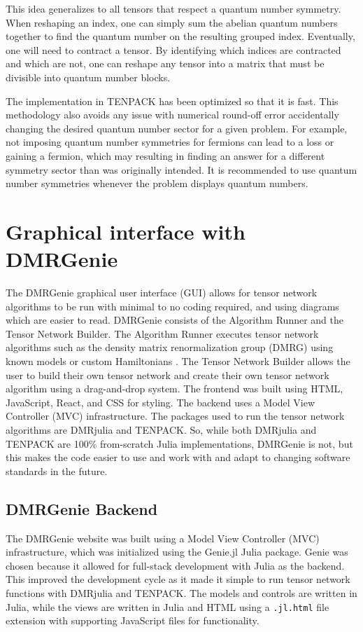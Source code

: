 \documentclass{juliacon}
\begin{document}
This idea generalizes to all tensors that respect a quantum number symmetry. When reshaping an index, one can simply sum the abelian quantum numbers together to find the quantum number on the resulting grouped index. Eventually, one will need to contract a tensor. By identifying which indices are contracted and which are not, one can reshape any tensor into a matrix that must be divisible into quantum number blocks.

The implementation in TENPACK has been optimized so that it is fast. This methodology also avoids any issue with numerical round-off error accidentally changing the desired quantum number sector for a given problem. For example, not imposing quantum number symmetries for fermions can lead to a loss or gaining a fermion, which may resulting in finding an answer for a different symmetry sector than was originally intended. It is recommended to use quantum number symmetries whenever the problem displays quantum numbers.



\section{Graphical interface with DMRGenie}
The DMRGenie graphical user interface (GUI) allows for tensor network algorithms to be run with minimal to no coding required, and using diagrams which are easier to read. DMRGenie consists of the Algorithm Runner and the Tensor Network Builder. The Algorithm Runner executes tensor network algorithms such as the density matrix renormalization group (DMRG) using known models or custom Hamiltonians \cite{dmrjulia1}. The Tensor Network Builder allows the user to build their own tensor network and create their own tensor network algorithm using a drag-and-drop system. The frontend was built using HTML, JavaScript, React, and CSS for styling. The backend uses a Model View Controller (MVC) infrastructure. The packages used to run the tensor network algorithms are DMRjulia and TENPACK. So, while both DMRjulia and TENPACK are 100\% from-scratch Julia implementations, DMRGenie is not, but this makes the code easier to use and work with and adapt to changing software standards in the future.

\subsection{DMRGenie Backend}\label{backend}
The DMRGenie website was built using a Model View Controller (MVC) infrastructure, which was initialized using the Genie.jl Julia package. Genie was chosen because it allowed for full-stack development with Julia as the backend. This improved the development cycle as it made it simple to run tensor network functions with DMRjulia and TENPACK. The models and controls are written in Julia, while the views are written in Julia and HTML using a \texttt{.jl.html} file extension with supporting JavaScript files for functionality. 
\end{document}
